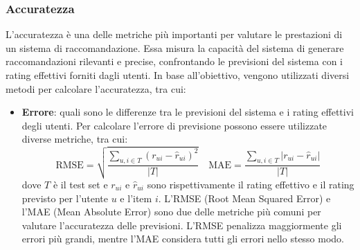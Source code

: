 \documentclass{report}
\begin{document}
	\subsubsection{Accuratezza}
	L'accuratezza è una delle metriche più importanti per valutare le prestazioni di un sistema di raccomandazione. Essa misura la capacità del sistema di generare raccomandazioni rilevanti e precise, confrontando le previsioni del sistema con i rating effettivi forniti dagli utenti. In base all'obiettivo, vengono utilizzati diversi metodi per calcolare l'accuratezza, tra cui:
	\begin{itemize}
		\item \textbf{Errore}: quali sono le differenze tra le previsioni del sistema e i rating effettivi degli utenti. Per calcolare l'errore di previsione possono essere utilizzate diverse metriche, tra cui:
		\[
			\text{RMSE} = \sqrt{\frac{\sum_{u,i \in T} \left(r_{ui} - \hat{r}_{ui}\right)^2}{|T|}}
			\quad \text{MAE} = \frac{\sum_{u,i \in T} \left|r_{ui} - \hat{r}_{ui}\right|}{|T|}
		\]
		dove $T$ è il test set e $r_{ui}$ e $\hat{r}_{ui}$ sono rispettivamente il rating effettivo e il rating previsto per l'utente $u$ e l'item $i$. L'RMSE (Root Mean Squared Error) e l'MAE (Mean Absolute Error) sono due delle metriche più comuni per valutare l'accuratezza delle previsioni. L'RMSE penalizza maggiormente gli errori più grandi, mentre l'MAE considera tutti gli errori nello stesso modo.


\end{itemize}
\end{document}
